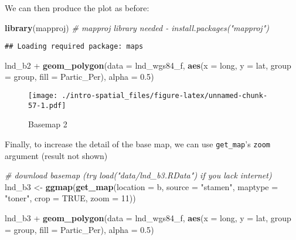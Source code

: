 \documentclass[]{article}
\newenvironment{Shaded}{}{}
\newcommand{\KeywordTok}[1]{\textcolor[rgb]{0.00,0.44,0.13}{\textbf{{#1}}}}
\newcommand{\DataTypeTok}[1]{\textcolor[rgb]{0.56,0.13,0.00}{{#1}}}
\newcommand{\DecValTok}[1]{\textcolor[rgb]{0.25,0.63,0.44}{{#1}}}
\newcommand{\FloatTok}[1]{\textcolor[rgb]{0.25,0.63,0.44}{{#1}}}
\newcommand{\StringTok}[1]{\textcolor[rgb]{0.25,0.44,0.63}{{#1}}}
\newcommand{\CommentTok}[1]{\textcolor[rgb]{0.38,0.63,0.69}{\textit{{#1}}}}
\newcommand{\OtherTok}[1]{\textcolor[rgb]{0.00,0.44,0.13}{{#1}}}
\newcommand{\NormalTok}[1]{{#1}}
\begin{document}
We can then produce the plot as before:

\begin{Shaded}
\begin{Highlighting}[]
\KeywordTok{library}\NormalTok{(mapproj) }\CommentTok{# mapproj library needed - install.packages("mapproj")}
\end{Highlighting}
\end{Shaded}

\begin{verbatim}
## Loading required package: maps
\end{verbatim}

\begin{Shaded}
\begin{Highlighting}[]
\NormalTok{lnd_b2 +}
\StringTok{  }\KeywordTok{geom_polygon}\NormalTok{(}\DataTypeTok{data =} \NormalTok{lnd_wgs84_f, }
    \KeywordTok{aes}\NormalTok{(}\DataTypeTok{x =} \NormalTok{long, }\DataTypeTok{y =} \NormalTok{lat, }\DataTypeTok{group =} \NormalTok{group, }\DataTypeTok{fill =} \NormalTok{Partic_Per), }\DataTypeTok{alpha =} \FloatTok{0.5}\NormalTok{)}
\end{Highlighting}
\end{Shaded}

\begin{figure}[htbp]
\centering
\texttt{[image: ./intro-spatial\_files/figure-latex/unnamed-chunk-57-1.pdf]}
\caption{Basemap 2}
\end{figure}

Finally, to increase the detail of the base map, we can use
\texttt{get\_map}'s \texttt{zoom} argument (result not shown)

\begin{Shaded}
\begin{Highlighting}[]
\CommentTok{# download basemap (try load("data/lnd_b3.RData") if you lack internet)}
\NormalTok{lnd_b3 <-}\StringTok{ }\KeywordTok{ggmap}\NormalTok{(}\KeywordTok{get_map}\NormalTok{(}\DataTypeTok{location =} \NormalTok{b, }\DataTypeTok{source =} \StringTok{"stamen"}\NormalTok{,}
  \DataTypeTok{maptype =} \StringTok{"toner"}\NormalTok{, }\DataTypeTok{crop =} \OtherTok{TRUE}\NormalTok{, }\DataTypeTok{zoom =} \DecValTok{11}\NormalTok{))}
\end{Highlighting}
\end{Shaded}

\begin{Shaded}
\begin{Highlighting}[]
\NormalTok{lnd_b3 +}
\StringTok{  }\KeywordTok{geom_polygon}\NormalTok{(}\DataTypeTok{data =} \NormalTok{lnd_wgs84_f,}
    \KeywordTok{aes}\NormalTok{(}\DataTypeTok{x =} \NormalTok{long, }\DataTypeTok{y =} \NormalTok{lat, }\DataTypeTok{group =} \NormalTok{group, }\DataTypeTok{fill =} \NormalTok{Partic_Per), }\DataTypeTok{alpha =} \FloatTok{0.5}\NormalTok{)}
\end{Highlighting}
\end{Shaded}
\end{document}

